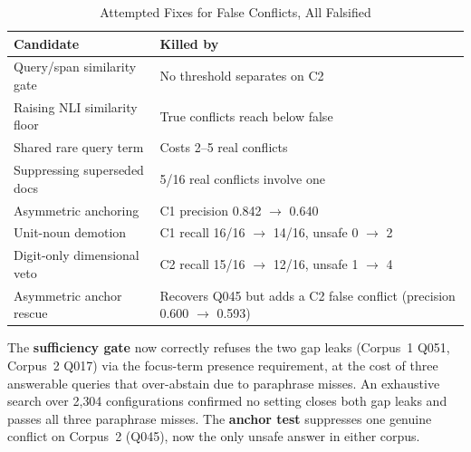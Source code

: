 \documentclass[conference]{IEEEtran}
\begin{document}
\begin{table}[htbp]
\caption{Attempted Fixes for False Conflicts, All Falsified}
\label{tab:failed_fixes}
\centering
\small
\begin{tabularx}{\columnwidth}{@{}l X@{}}
\toprule
Candidate & Killed by \\
\midrule
Query/span similarity gate & No threshold separates on C2 \\
Raising NLI similarity floor & True conflicts reach below false \\
Shared rare query term & Costs 2--5 real conflicts \\
Suppressing superseded docs & 5/16 real conflicts involve one \\
Asymmetric anchoring & C1 precision 0.842 $\to$ 0.640 \\
Unit-noun demotion & C1 recall 16/16 $\to$ 14/16, unsafe 0 $\to$ 2 \\
Digit-only dimensional veto & C2 recall 15/16 $\to$ 12/16, unsafe 1 $\to$ 4 \\
Asymmetric anchor rescue & Recovers Q045 but adds a C2 false conflict (precision 0.600 $\to$ 0.593) \\
\bottomrule
\end{tabularx}
\end{table}

The \textbf{sufficiency gate} now correctly refuses the two gap leaks
(Corpus~1 Q051, Corpus~2 Q017) via the focus-term presence requirement, at the cost
of three answerable queries that over-abstain due to paraphrase misses.
An exhaustive search over 2{,}304 configurations confirmed no setting
closes both gap leaks and passes all three paraphrase misses. The
\textbf{anchor test} suppresses one genuine conflict on Corpus~2
(Q045), now the only unsafe answer in either corpus.
\end{document}
